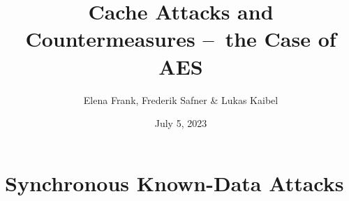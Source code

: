 \documentclass{article}
\title{\textbf{Cache Attacks and Countermeasures – the Case of AES}}
\author{Elena Frank, Frederik Safner \& Lukas Kaibel}
\date{July 5, 2023}
\begin{document}
\maketitle

\tableofcontents

\newpage




\section{Synchronous Known-Data Attacks}










\end{document}
